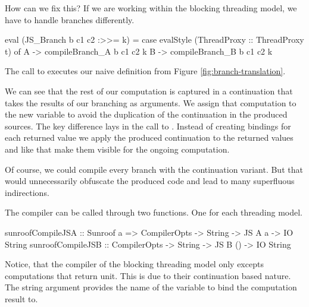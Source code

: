 How can we fix this? If we are working within the blocking 
threading model, we have to handle branches differently.
\begin{Code}
eval (JS_Branch b c1 c2 :>>= k) = 
  case evalStyle (ThreadProxy :: ThreadProxy t) of
    A -> compileBranch_A b c1 c2 k
    B -> compileBranch_B b c1 c2 k
\end{Code}
The call to 
executes our naive definition from Figure \ref{fig:branch-translation}.
We can see that the rest of our computation is captured in a
continuation  that takes the results of our branching
as arguments. We assign that computation to the new variable 
to avoid the duplication of the continuation in the produced sources.
The key difference lays in the call to . Instead
of creating bindings for each returned value we apply the produced
continuation to the returned values and like that make them visible for
the ongoing computation.
\begin{comment}
, even if we capture our current continuation. 
Now the produced code looks like this:
\begin{Code}
var v11 = function() {
  var v2 = function(v0) { CallAfterIf(v0); };
  if(true){
    var v5 = function(v3) { v2(v3); };
    /* True Case */
    v5(true);
  } else {
    var v9 = function(v7) { v2(v7); };
    /* False Case */
    v9(false);
  }
};
v11();
\end{Code}
We can see that the function call after the branch is captured by the 
continuation \Src{v2} and that continuation is called with the 
return values as parameters inside each branch.
\end{comment}

Of course, we could compile every branch with the 
continuation variant. But that would unnecessarily 
obfuscate the produced code and lead to many superfluous 
indirections.

The compiler can be called through two functions. 
One for each threading model.
\begin{Code}
sunroofCompileJSA :: Sunroof a 
                  => CompilerOpts -> String -> JS A a  -> IO String
sunroofCompileJSB :: CompilerOpts -> String -> JS B () -> IO String
\end{Code}
Notice, that the compiler of the blocking threading model only
excepts computations that return unit. This is due to their 
continuation based nature. The string argument provides 
the name of the variable to bind the computation result to.










